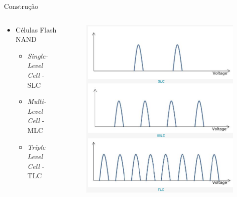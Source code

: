 \documentclass[aspectratio=169,
				xcolor=table]{beamer}
\begin{document}
	\begin{frame}{Construção}
	
		\begin{columns}
			\begin{column}{0.5\textwidth}
				\begin{itemize}
					\item Células Flash NAND
					\begin{itemize}
						\item \textit{Single-Level Cell} - SLC
						\item \textit{Multi-Level Cell} - MLC
						\item \textit{Triple-Level Cell} - TLC
					\end{itemize}			
				\end{itemize}
			\end{column}
			\begin{column}{0.5\textwidth}
				\begin{figure}[hbtp]
					\centering
					\includegraphics[height=0.8\textheight, keepaspectratio]{../figs/cap08/ssd03.png}
				\end{figure}
			\end{column}
		\end{columns}
		

		
	\end{frame}
	
\end{document}

